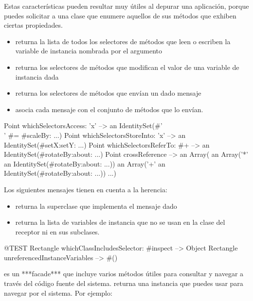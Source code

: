 \documentclass[a4paper,10pt,twoside]{book}
\begin{document}
Estas características pueden resultar muy útiles al depurar una
aplicación, porque puedes solicitar a una clase que enumere aquellos
de sus métodos que exhiben ciertas propiedades.
\begin{itemize}
\item {} returna la lista de
  todos los selectores de métodos que leen o escriben la variable de
  instancia nombrada por el argumento
\item {} returna los
  selectores de métodos que modifican el valor de una variable de
  instancia dada
\item {} returna los selectores
  de métodos que envían un dado mensaje
\item {} asocia cada mensaje con el
  conjunto de métodos que lo envían.
\end{itemize}

\begin{code}{} %
Point whichSelectorsAccess: 'x'    --> an IdentitySet(#'\\' #= #scaleBy: ...)
Point whichSelectorsStoreInto: 'x' --> an IdentitySet(#setX:setY: ...)
Point whichSelectorsReferTo: #+  --> an IdentitySet(#rotateBy:about: ...)
Point crossReference --> an Array(
                an Array('*' an IdentitySet(#rotateBy:about: ...))
                an Array('+' an IdentitySet(#rotateBy:about: ...))
                ...)
\end{code}

Los siguientes mensajes tienen en cuenta a la herencia:

\begin{itemize}
\item {} returna la
  superclase que implementa el mensaje dado
\item {} returna la
  lista de variables de instancia que no se usan en la clase del
  receptor ni en sus subclases.
\end{itemize}

\begin{code}{@TEST}
Rectangle whichClassIncludesSelector: #inspect --> Object
Rectangle unreferencedInstanceVariables            --> #()
\end{code}

 es un ***facade*** que incluye varios
métodos útiles para consultar y navegar a través del código fuente del
sistema.    returna una instancia que puedes usar para navegar
por el sistema.  Por ejemplo:
\end{document}

